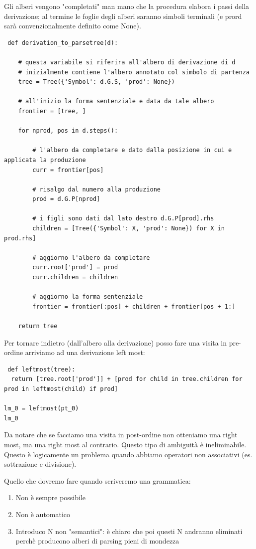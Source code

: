 Gli alberi vengono "completati" man mano che la procedura elabora i passi della derivazione; al termine le foglie degli alberi saranno simboli terminali (e prord sarà convenzionalmente definito come None).
\begin{lstlisting}
 def derivation_to_parsetree(d):

    # questa variabile si riferira all'albero di derivazione di d
    # inizialmente contiene l'albero annotato col simbolo di partenza
    tree = Tree({'Symbol': d.G.S, 'prod': None})

    # all'inizio la forma sentenziale e data da tale albero
    frontier = [tree, ] 

    for nprod, pos in d.steps():

        # l'albero da completare e dato dalla posizione in cui e applicata la produzione
        curr = frontier[pos]

        # risalgo dal numero alla produzione
        prod = d.G.P[nprod]

        # i figli sono dati dal lato destro d.G.P[prod].rhs
        children = [Tree({'Symbol': X, 'prod': None}) for X in prod.rhs]
        
        # aggiorno l'albero da completare
        curr.root['prod'] = prod
        curr.children = children

        # aggiorno la forma sentenziale
        frontier = frontier[:pos] + children + frontier[pos + 1:]

    return tree
\end{lstlisting}

Per tornare indietro (dall'albero alla derivazione) posso fare una visita in pre-ordine arriviamo ad una derivazione left most:
\begin{lstlisting}
 def leftmost(tree):
  return [tree.root['prod']] + [prod for child in tree.children for prod in leftmost(child) if prod] 
    
lm_0 = leftmost(pt_0)
lm_0
\end{lstlisting}

Da notare che se facciamo una visita in post-ordine non otteniamo una right most, ma una right most al contrario. Questo tipo di ambiguità è ineliminabile.
Questo è logicamente un problema quando abbiamo operatori non associativi (es. sottrazione e divisione).

Quello che dovremo fare quando scriveremo una grammatica:
\begin{enumerate}
    \item Non è sempre possibile
    \item Non è automatico
    \item Introduco N non "semantici": è chiaro che poi questi N andranno eliminati perchè producono alberi di parsing pieni di mondezza
\end{enumerate}

